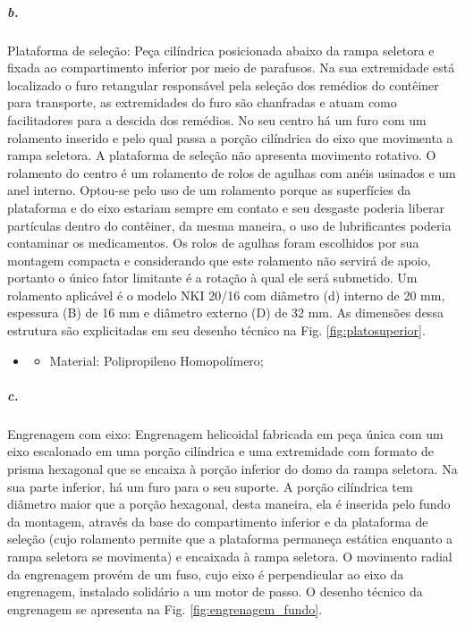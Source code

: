     
    \subparagraph*{b.} \label{retorno_platosuperior}
    Plataforma de seleção: Peça cilíndrica posicionada abaixo da rampa seletora e fixada ao compartimento inferior por meio de parafusos. Na sua extremidade está localizado o furo retangular responsável pela seleção dos remédios do contêiner para transporte, as extremidades do furo são chanfradas e atuam como facilitadores para a descida dos remédios. No seu centro há um furo com um rolamento inserido e pelo qual passa a porção cilíndrica do eixo que movimenta a rampa seletora. A plataforma de seleção não apresenta movimento rotativo. 
    O rolamento do centro é um rolamento de rolos de agulhas com anéis usinados e um anel interno. Optou-se pelo uso de um rolamento porque as superfícies da plataforma e do eixo estariam sempre em contato e seu desgaste poderia liberar partículas dentro do contêiner, da mesma maneira, o uso de lubrificantes poderia contaminar os medicamentos. Os rolos de agulhas foram escolhidos por sua montagem compacta e considerando que este rolamento não servirá de apoio, portanto o único fator limitante é a rotação à qual ele será submetido. Um rolamento aplicável é o modelo NKI 20/16 com diâmetro (d) interno de 20 mm, espessura (B) de 16 mm e diâmetro externo (D) de 32 mm.
    As dimensões dessa estrutura são explicitadas em seu desenho técnico na Fig. \ref{fig:platosuperior}.
    
    \begin{itemize}
   \item[]
   \begin{itemize}
       \item  Material: Polipropileno Homopolímero;
   \end{itemize}
   \end{itemize}
   
    
    \subparagraph*{c.} \label{retorno_engrenagem_fundo}
    Engrenagem com eixo: Engrenagem helicoidal fabricada em peça única com um eixo escalonado em uma porção cilíndrica e uma extremidade com formato de prisma hexagonal que se encaixa à porção inferior do domo da rampa seletora. Na sua parte inferior, há um furo para o seu suporte.
    A porção cilíndrica tem diâmetro maior que a porção hexagonal, desta maneira, ela é inserida pelo fundo da montagem, através da base do compartimento inferior e da plataforma de seleção (cujo rolamento permite que a plataforma permaneça estática enquanto a rampa seletora se movimenta) e encaixada à rampa seletora. O movimento radial da engrenagem provém de um fuso, cujo eixo é perpendicular ao eixo da engrenagem, instalado solidário a um motor de passo. O desenho técnico da engrenagem se apresenta na Fig. \ref{fig:engrenagem_fundo}.
    
